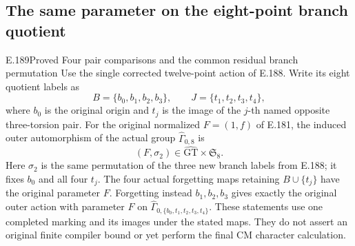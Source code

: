\subsection{The same parameter on the eight-point branch quotient}

\begin{result}{E.189}{Proved}
{Four pair comparisons and the common residual branch permutation}
Use the single corrected twelve-point action of E.188.
Write its eight quotient labels as
\[
 B=\{b_0,b_1,b_2,b_3\},\qquad
 J=\{t_1,t_2,t_3,t_4\},
\tag{E.189.1}
\]
where \(b_0\) is the original origin and \(t_j\) is the
image of the \(j\)-th named opposite three-torsion pair.
For the original normalized \(F=(1,f)\) of E.181, the
induced outer automorphism of the actual group
\(\widehat\Gamma_{0,8}\) is
\[
                            (F,\sigma_2)
       \in\widehat{\mathrm{GT}}\times\mathfrak S_8.
\tag{E.189.2}
\]
Here \(\sigma_2\) is the same permutation of the three
new branch labels from E.188; it fixes \(b_0\) and
all four \(t_j\).
The four actual forgetting maps retaining \(B\cup\{t_j\}\)
have the original parameter \(F\).  Forgetting instead
\(b_1,b_2,b_3\) gives exactly the original outer action
with parameter \(F\) on
\(\widehat\Gamma_{0,\{b_0,t_1,t_2,t_3,t_4\}}\).
These statements use one completed marking and its
images under the stated maps.
They do not assert an original finite compiler bound
or yet perform the final CM character calculation.
\end{result}

